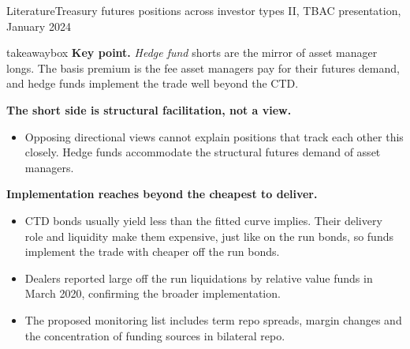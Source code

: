 \documentclass[aspectratio=169,11pt]{beamer}
\newcommand{\keypoint}[1]{%
  \begin{beamercolorbox}[sep=0.6em,wd=\textwidth]{takeawaybox}
    \textbf{Key point.} #1
  \end{beamercolorbox}}
\begin{document}
\begin{frame}{Literature}{Treasury futures positions across investor types II, TBAC presentation, January 2024}
  \footnotesize
  \keypoint{\textit{Hedge fund} shorts are the mirror of asset manager longs. The basis premium is the fee asset managers pay for their futures demand, and hedge funds implement the trade well beyond the CTD.}
  \medskip
  \textbf{The short side is structural facilitation, not a view.}
  \begin{itemize}
    \item Opposing directional views cannot explain positions that track each other this closely. Hedge funds accommodate the structural futures demand of asset managers.
  \end{itemize}
  \smallskip
  \textbf{Implementation reaches beyond the cheapest to deliver.}
  \begin{itemize}
    \item CTD bonds usually yield less than the fitted curve implies. Their delivery role and liquidity make them expensive, just like on the run bonds, so funds implement the trade with cheaper off the run bonds.
    \item Dealers reported large off the run liquidations by relative value funds in March 2020, confirming the broader implementation.
    \item The proposed monitoring list includes term repo spreads, margin changes and the concentration of funding sources in bilateral repo.
  \end{itemize}
\end{frame}
\end{document}
